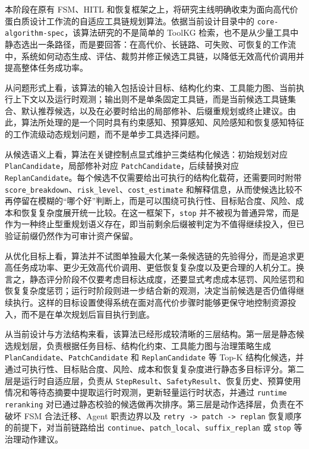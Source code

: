 本阶段在原有 FSM、HITL 和恢复框架之上，将研究主线明确收束为面向高代价蛋白质设计工作流的自适应工具链规划算法。依据当前设计目录中的 \texttt{core-algorithm-spec}，该算法研究的不是简单的 ToolKG 检索，也不是从少量工具中静态选出一条路径，而是要回答：在高代价、长链路、可失败、可恢复的工作流中，系统如何动态生成、评估、裁剪并修正候选工具链，以降低无效高代价调用并提高整体任务成功率。

从问题形式上看，该算法的输入包括设计目标、结构化约束、工具能力图、当前执行上下文以及运行时观测；输出则不是单条固定工具链，而是当前候选工具链集合、默认推荐候选，以及在必要时给出的局部修补、后缀重规划或终止建议。由此，算法所处理的是一个同时具有约束感知、预算感知、风险感知和恢复感知特征的工作流级动态规划问题，而不是单步工具选择问题。

从候选语义上看，算法在关键控制点显式维护三类结构化候选：初始规划对应 \texttt{PlanCandidate}，局部修补对应 \texttt{PatchCandidate}，后续替换对应 \texttt{ReplanCandidate}。每个候选不仅需要给出可执行的结构化载荷，还需要同时附带 \texttt{score\_breakdown}、\texttt{risk\_level}、\texttt{cost\_estimate} 和解释信息，从而使候选比较不再停留在模糊的“哪个好”判断上，而是可以围绕可执行性、目标贴合度、风险、成本和恢复复杂度展开统一比较。在这一框架下，\texttt{stop} 并不被视为普通异常，而是作为一种终止型重规划语义存在，即当前剩余后缀被判定为不值得继续投入，但已验证前缀仍然作为可审计资产保留。

从优化目标上看，算法并不试图单独最大化某一条候选链的先验得分，而是追求更高任务成功率、更少无效高代价调用、更低恢复复杂度以及更合理的人机分工。换言之，静态评分阶段不仅要考虑目标达成度，还要显式考虑成本惩罚、风险惩罚和恢复复杂度惩罚；运行时阶段则进一步结合新的观测，决定当前候选是否仍值得继续执行。这样的目标设置使得系统在面对高代价步骤时能够更保守地控制资源投入，而不是在单次规划后盲目执行到底。

从当前设计与方法结构来看，该算法已经形成较清晰的三层结构。第一层是静态候选规划层，负责根据任务目标、结构化约束、工具能力图与治理策略生成 \texttt{PlanCandidate}、\texttt{PatchCandidate} 和 \texttt{ReplanCandidate} 等 Top-K 结构化候选，并通过可执行性、目标贴合度、风险、成本和恢复复杂度进行静态多目标评分。第二层是运行时自适应层，负责从 \texttt{StepResult}、\texttt{SafetyResult}、恢复历史、预算使用情况和等待态摘要中提取运行时观测，更新轻量运行时状态，并通过 \texttt{runtime reranking} 对已通过静态校验的候选做再次排序。第三层是动作选择层，负责在不破坏 FSM 合法迁移、Agent 职责边界以及 \texttt{retry -> patch -> replan} 恢复顺序的前提下，对当前链路给出 \texttt{continue}、\texttt{patch\_local}、\texttt{suffix\_replan} 或 \texttt{stop} 等治理动作建议。


